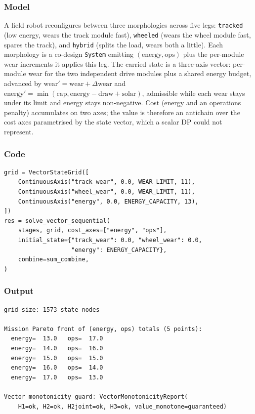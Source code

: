 \documentclass[11pt,a4paper]{article}
\begin{document}
\subsubsection*{Model}
A field robot reconfigures between three morphologies across five legs:
\texttt{tracked} (low energy, wears the track module fast), \texttt{wheeled}
(wears the wheel module fast, spares the track), and \texttt{hybrid}
(splits the load, wears both a little). Each morphology is a co-design
\texttt{System} emitting $(\text{energy},\text{ops})$ plus the per-module
wear increments it applies this leg. The carried state is a three-axis
vector: per-module wear for the two independent drive modules plus a
shared energy budget, advanced by
$\text{wear}'=\text{wear}+\Delta\text{wear}$ and
$\text{energy}'=\min(\text{cap},\text{energy}-\text{draw}+\text{solar})$,
admissible while each wear stays under its limit and energy stays
non-negative. Cost (energy and an operations penalty) accumulates on two
axes; the value is therefore an antichain over the cost axes
parametrised by the state vector, which a scalar DP could not represent.

\subsubsection*{Code}
\begin{lstlisting}
grid = VectorStateGrid([
    ContinuousAxis("track_wear", 0.0, WEAR_LIMIT, 11),
    ContinuousAxis("wheel_wear", 0.0, WEAR_LIMIT, 11),
    ContinuousAxis("energy", 0.0, ENERGY_CAPACITY, 13),
])
res = solve_vector_sequential(
    stages, grid, cost_axes=["energy", "ops"],
    initial_state={"track_wear": 0.0, "wheel_wear": 0.0,
                   "energy": ENERGY_CAPACITY},
    combine=sum_combine,
)
\end{lstlisting}

\subsubsection*{Output}
\begin{lstlisting}[language={},numbers=none,keywordstyle={}]
grid size: 1573 state nodes

Mission Pareto front of (energy, ops) totals (5 points):
  energy=  13.0   ops=  17.0
  energy=  14.0   ops=  16.0
  energy=  15.0   ops=  15.0
  energy=  16.0   ops=  14.0
  energy=  17.0   ops=  13.0

Vector monotonicity guard: VectorMonotonicityReport(
    H1=ok, H2=ok, H2joint=ok, H3=ok, value_monotone=guaranteed)
\end{lstlisting}
\end{document}
